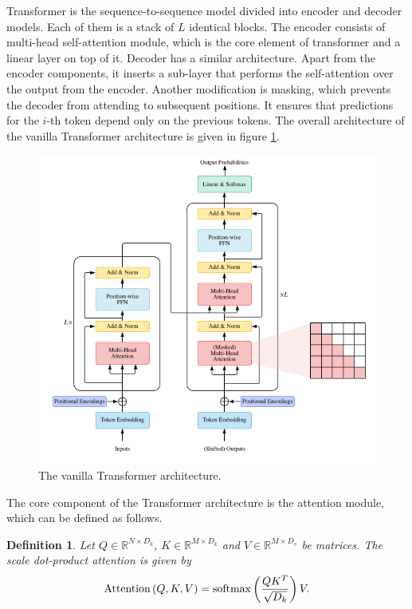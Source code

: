 \documentclass[magisterska,en]{pracamgr}
\newtheorem{defi}{Definition}[section]
\begin{document}
Transformer is the sequence-to-sequence model divided into encoder and decoder models. Each of them is a stack of $L$ identical blocks. The encoder consists of multi-head self-attention module, which is the core element of transformer and a linear layer on top of it. Decoder has a similar architecture. Apart from the encoder components, it inserts a sub-layer that performs the self-attention over the output from the encoder. Another modification is masking, which prevents the decoder from attending to subsequent positions. It ensures that predictions for the $i$-th token depend only on the previous tokens. The overall architecture of the vanilla Transformer architecture is given in figure \ref{attention}.

\begin{figure}[H]
\centering
\includegraphics[scale=0.5]{images/attention.png}
\caption{The vanilla Transformer architecture.}
\label{attention}
\end{figure}


The core component of the Transformer architecture is the attention module, which can be defined as follows.

\begin{defi}\label{attention_def}
    Let $Q \in \mathbb{R}^{N\times D_k}$, $K \in \mathbb{R}^{M\times D_k}$ and $V \in \mathbb{R}^{M\times D_v}$ be matrices. The scale dot-product attention is given by
        \begin{equation*}
        \normalfont
        \textrm{Attention} \left( Q, K, V \right) = \textrm{softmax}\left(\frac{QK^T}{\sqrt{D_k}} \right) V.
    \end{equation*}

\end{defi}
\end{document}
